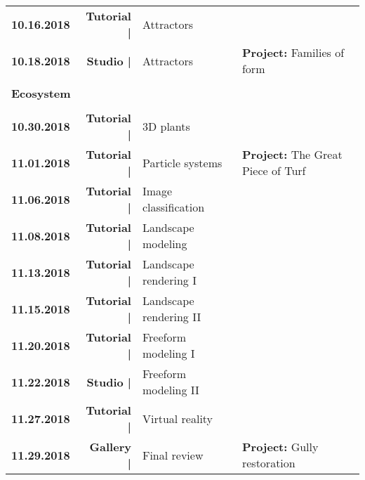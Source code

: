 \documentclass[11pt,article,oneside]{memoir}
\begin{document}
\begin{table}[H]
\begin{tabular}{l r @{\hskip 0.1cm} l @{\hskip 0.5cm} l}
%
\textbf{10.16.2018} & \textbf{Tutorial |} & Attractors \\
\textbf{10.18.2018} & \textbf{Studio |} & Attractors & \textbf{Project:} Families of form \\
\\
\normalsize
\textbf{Ecosystem}\\
\small
\\
\textbf{10.30.2018} & \textbf{Tutorial |} & 3D plants \\
\textbf{11.01.2018} & \textbf{Tutorial |} & Particle systems & \textbf{Project:} The Great Piece of Turf \\
%
\textbf{11.06.2018} & \textbf{Tutorial |} & Image classification \\
\textbf{11.08.2018} & \textbf{Tutorial |} & Landscape modeling \\
%
\textbf{11.13.2018} & \textbf{Tutorial |} & Landscape rendering I \\
\textbf{11.15.2018} & \textbf{Tutorial |} & Landscape rendering II \\
%
\textbf{11.20.2018} & \textbf{Tutorial |} & Freeform modeling I \\
\textbf{11.22.2018} & \textbf{Studio |} & Freeform modeling II \\
%
\textbf{11.27.2018} & \textbf{Tutorial |} & Virtual reality\\
\textbf{11.29.2018} & \textbf{Gallery |} & Final review & \textbf{Project:} Gully restoration \\ 
%
\end{tabular}
\end{table}

\clearpage

%


\end{document}
